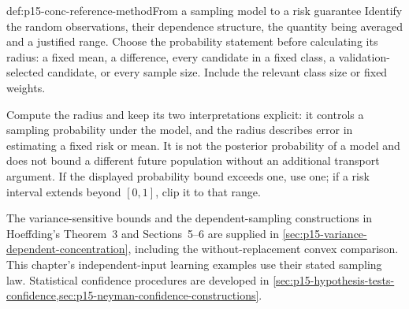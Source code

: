 \begin{hbmethod}{def:p15-conc-reference-method}{From a sampling model to a risk guarantee}
Identify the random observations, their dependence structure, the
quantity being averaged and a justified range. Choose the probability
statement before calculating its radius: a fixed mean, a difference,
every candidate in a fixed class, a validation-selected candidate, or
every sample size. Include the relevant class size or fixed weights.

Compute the radius and keep its two interpretations explicit:
it controls a sampling probability under the model, and the radius
describes error in estimating a fixed risk or mean. It is not the
posterior probability of a model and does not bound a different future
population without an additional transport argument.
If the displayed probability bound exceeds one, use one; if a risk
interval extends beyond \([0,1]\), clip it to that range.
\end{hbmethod}

The variance-sensitive bounds and the dependent-sampling constructions
in Hoeffding's Theorem~3 and Sections~5--6 are supplied in
\cref{sec:p15-variance-dependent-concentration}, including the
without-replacement convex comparison. This chapter's independent-input
learning examples use their stated sampling law. Statistical confidence
procedures are developed in
\cref{sec:p15-hypothesis-tests-confidence,sec:p15-neyman-confidence-constructions}.
